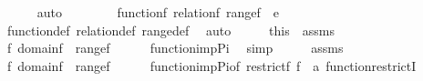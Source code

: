\begin{isabellebody}
\ \ \ \ \isamarkupfalse%
\ auto\isanewline
\ \ \isamarkupfalse%
\ \isanewline
\ \ \isamarkupfalse%
\ {\isachardoublequoteopen}function{\isacharparenleft}{\kern0pt}{\isacharquery}{\kern0pt}f{}{\isacharparenright}{\kern0pt}{\isachardoublequoteclose}\ {\isachardoublequoteopen}relation{\isacharparenleft}{\kern0pt}{\isacharquery}{\kern0pt}f{}{\isacharparenright}{\kern0pt}{\isachardoublequoteclose}\ {\isachardoublequoteopen}range{\isacharparenleft}{\kern0pt}{\isacharquery}{\kern0pt}f{}{\isacharparenright}{\kern0pt}\ {\isasymsubseteq}\ {\isacharbraceleft}{\kern0pt}e{\isacharbraceright}{\kern0pt}{\isachardoublequoteclose}\isanewline
\ \ \ \ \isamarkupfalse%
\ function{\isacharunderscore}{\kern0pt}def\ relation{\isacharunderscore}{\kern0pt}def\ range{\isacharunderscore}{\kern0pt}def\ \isamarkupfalse%
\ auto\isanewline
\ \ \isamarkupfalse%
\ \isamarkupfalse%
\ this\ \ assms\ \isanewline
\ \ \isamarkupfalse%
\ {\isachardoublequoteopen}{\isacharquery}{\kern0pt}f{}{\isacharcolon}{\kern0pt}\ domain{\isacharparenleft}{\kern0pt}{\isacharquery}{\kern0pt}f{}{\isacharparenright}{\kern0pt}\ {\isasymrightarrow}\ range{\isacharparenleft}{\kern0pt}{\isacharquery}{\kern0pt}f{}{\isacharparenright}{\kern0pt}{\isachardoublequoteclose}\isanewline
\ \ \ \ \isamarkupfalse%
\ function{\isacharunderscore}{\kern0pt}imp{\isacharunderscore}{\kern0pt}Pi\ \isamarkupfalse%
\ simp\isanewline
\ \ \isamarkupfalse%
\ \isamarkupfalse%
\ assms\ \isanewline
\ \ \isamarkupfalse%
\ {\isachardoublequoteopen}{\isacharquery}{\kern0pt}f{}{\isacharcolon}{\kern0pt}\ domain{\isacharparenleft}{\kern0pt}{\isacharquery}{\kern0pt}f{}{\isacharparenright}{\kern0pt}\ {\isasymrightarrow}\ range{\isacharparenleft}{\kern0pt}{\isacharquery}{\kern0pt}f{}{\isacharparenright}{\kern0pt}{\isachardoublequoteclose}\isanewline
\ \ \ \ \isamarkupfalse%
\ function{\isacharunderscore}{\kern0pt}imp{\isacharunderscore}{\kern0pt}Pi{\isacharbrackleft}{\kern0pt}of\ {\isachardoublequoteopen}restrict{\isacharparenleft}{\kern0pt}f{\isacharcomma}{\kern0pt}\ f\ {\isacharminus}{\kern0pt}{\isacharbackquote}{\kern0pt}{\isacharbackquote}{\kern0pt}\ a{\isacharparenright}{\kern0pt}{\isachardoublequoteclose}{\isacharbrackright}{\kern0pt}\ function{\isacharunderscore}{\kern0pt}restrictI\ \isamarkupfalse%

\end{isabellebody}
